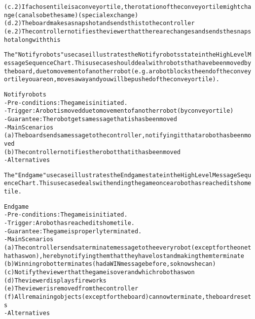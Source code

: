 \begin{alltt}
    (c.2) If a chosen tile is a conveyor tile, the rotation of the conveyor tile might change (can also be the same) (special exchange)
    (d.2) The board makes a snapshot and sends this to the controller
    (e.2) The controller notifies the viewer that there are changes and sends the snapshot along with this

The "Notify robots" use case illustrates the Notify robots state in the High Level Message Sequence Chart. This use case should deal with robots that have been moved by the board, due to movement of another robot (e.g. a robot blocks the end of the conveyor tile you are on, moves away and you will be pushed of the conveyor tile).

Notify robots
- Pre-conditions: The game is initiated.
- Trigger: A robot is moved due to movement of another robot (by conveyor tile)
- Guarantee: The robot gets a message that is has been moved
- Main Scenarios
    (a) The board sends a message to the controller, notifying it that a robot has been moved
    (b) The controller notifies the robot that it has been moved
- Alternatives

The "End game" use case illustrates the End game state in the High Level Message Sequence Chart. This use case deals with ending the game once a robot has reached its home tile.

End game
- Pre-conditions: The game is initiated.
- Trigger:  A robot has reached its home tile.
- Guarantee: The game is properly terminated.
- Main Scenarios
    (a) The controller sends a terminate message to the every robot (except for the one that has won), hereby notifying them that they have lost and making them terminate
    (b) Winning robot terminates (had a WIN message before, so knows he can)
    (c) Notify the viewer that the game is over and which robot has won
    (d) The viewer displays fireworks
    (e) The viewer is removed from the controller
    (f) All remaining objects (except for the board) can now terminate, the board resets
- Alternatives

\end{alltt}
